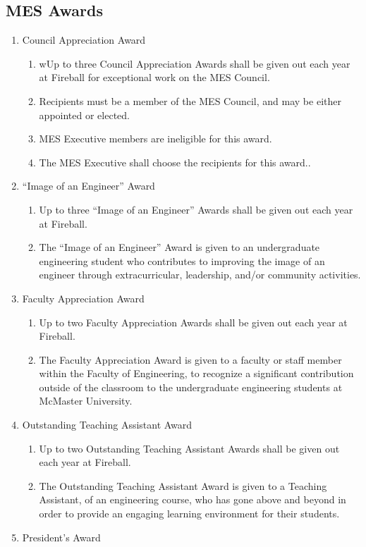 \subsection{MES Awards}
\label{mes-awards}
\begin{enumerate}
 \item
  Council Appreciation Award

  \begin{enumerate}
   \item
    wUp to three Council Appreciation Awards shall be given out each
    year at Fireball for exceptional work on the MES Council.
   \item
    Recipients must be a member of the MES Council, and may be either
    appointed or elected.
   \item
    MES Executive members are ineligible for this award.
   \item
    The MES Executive shall choose the recipients for this award..
  \end{enumerate}
 \item
  ``Image of an Engineer'' Award

  \begin{enumerate}
   \item
    Up to three ``Image of an Engineer'' Awards shall be given out each
    year at Fireball.
   \item
    The ``Image of an Engineer'' Award is given to an undergraduate
    engineering student who contributes to improving the image of an
    engineer through extracurricular, leadership, and/or community
    activities.
  \end{enumerate}
 \item
  Faculty Appreciation Award

  \begin{enumerate}
   \item
    Up to two Faculty Appreciation Awards shall be given out each year
    at Fireball.
   \item
    The Faculty Appreciation Award is given to a faculty or staff member
    within the Faculty of Engineering, to recognize a significant
    contribution outside of the classroom to the undergraduate
    engineering students at McMaster University.
  \end{enumerate}
 \item
  Outstanding Teaching Assistant Award

  \begin{enumerate}
   \item
    Up to two Outstanding Teaching Assistant Awards shall be given out
    each year at Fireball.
   \item
    The Outstanding Teaching Assistant Award is given to a Teaching
    Assistant, of an engineering course, who has gone above and beyond
    in order to provide an engaging learning environment for their
    students.
  \end{enumerate}
 \item
  President's Award


\end{enumerate}
